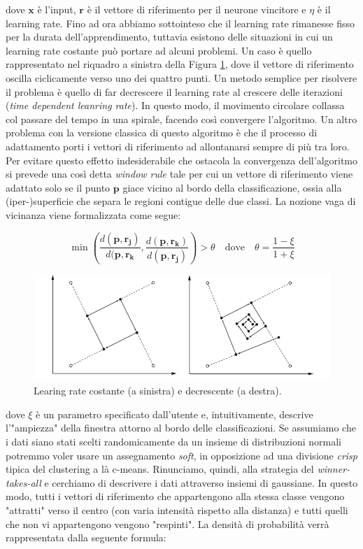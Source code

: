 \documentclass[10pt,a4paper]{article}
\begin{document}
dove $\mathbf{x}$ è l'input, $\mathbf{r}$ è il vettore di riferimento per il neurone vincitore e $\eta$ è il learning rate. Fino ad ora abbiamo sottointeso che il learning rate rimanesse fisso per la durata dell'apprendimento, tuttavia esistono delle situazioni in cui un learning rate costante può portare ad alcuni problemi. Un caso è quello rappresentato nel riquadro a sinistra della Figura \ref{fig:20}, dove il vettore di riferimento oscilla ciclicamente verso uno dei quattro punti. Un metodo semplice per risolvere il problema è quello di far decrescere il learning rate al crescere delle iterazioni (\emph{time dependent leanring rate}). In questo modo, il movimento circolare collassa col passare del tempo in una spirale, facendo così convergere l'algoritmo.
Un altro problema con la versione classica di questo algoritmo è che il processo di adattamento porti i vettori di riferimento ad allontanarsi sempre di più tra loro. Per evitare questo effetto indesiderabile che ostacola la convergenza dell'algoritmo si prevede una così detta \emph{window rule} tale per cui un vettore di riferimento viene adattato solo se il punto $\mathbf{p}$ giace vicino al bordo della classificazione, ossia alla (iper-)superficie che separa le regioni contigue delle due classi. La nozione vaga di vicinanza viene formalizzata come segue:

$$
\min(\frac{d(\mathbf{p},\mathbf{r_j})}{d(\mathbf{p},\mathbf{r_k}},\frac{d(\mathbf{p},\mathbf{r_k})}{d(\mathbf{p},\mathbf{r_j})}) > \theta \quad \text{dove} \quad \theta = \frac{1 - \xi}{1 + \xi}
$$ 

\begin{figure}
\centering
\includegraphics[scale=0.4]{img/oscill.png}
\caption{Learing rate costante (a sinistra) e decrescente (a destra).}
\label{fig:20}
\end{figure}

dove $\xi$ è un parametro specificato dall'utente e, intuitivamente, descrive l'"ampiezza" della finestra attorno al bordo delle classificazioni.
Se assumiamo che i dati siano stati scelti randomicamente da un insieme di distribuzioni normali potremmo voler usare un assegnamento \emph{soft}, in opposizione ad una divisione \emph{crisp} tipica del clustering a là c-means. Rinunciamo, quindi, alla strategia del \emph{winner-takes-all} e cerchiamo di descrivere i dati attraverso insiemi di gaussiane. In questo modo, tutti i vettori di riferimento che appartengono alla stessa classe vengono "attratti" verso il centro (con varia intensità rispetto alla distanza) e tutti quelli che non vi appartengono vengono "respinti". La densità di probabilità verrà rappresentata dalla seguente formula:
\end{document}
